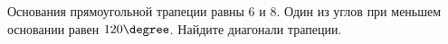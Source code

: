 \begin{ex}
	\begin{condition}
		Основания прямоугольной трапеции равны \( 6  \) и \( 8 \). Один из углов при меньшем основании равен \( 120\degree \). Найдите диагонали трапеции.
	\end{condition}
\end{ex}